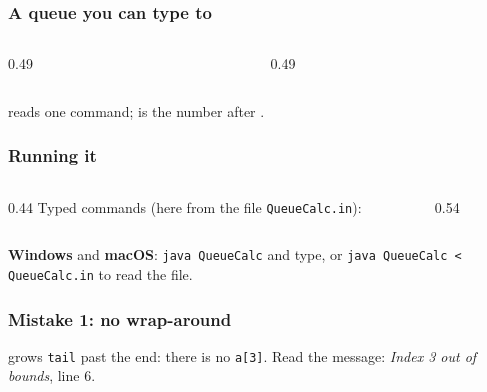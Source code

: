 \documentclass[aspectratio=169,10pt,compress]{beamer}
\newcommand{\win}{\textbf{Windows}}
\newcommand{\mac}{\textbf{macOS}}
\begin{document}




\begin{frame}[t,fragile] \frametitle{A queue you can type to}
  \begin{columns}[T]
    \begin{column}{0.49\textwidth}
    \end{column}
    \begin{column}{0.49\textwidth}
    \end{column}
  \end{columns}
  \small {} reads one command;  is the number after .
\end{frame}




\begin{frame}[t,fragile] \frametitle{Running it}
  \begin{columns}[T]
    \begin{column}{0.44\textwidth}
      \small Typed commands (here from the file \texttt{QueueCalc.in}):
    \end{column}
    \begin{column}{0.54\textwidth}
    \end{column}
  \end{columns}
  \small \win{} and \mac: \texttt{java QueueCalc} and type, or \texttt{java QueueCalc < QueueCalc.in} to read the file.
\end{frame}





\begin{frame}[t,fragile] \frametitle{Mistake 1: no wrap-around}

  \vspace{0.2em}
  \small {} grows \texttt{tail} past the end: there is no \texttt{a[3]}. Read the message: \emph{Index 3 out of bounds}, line 6.
\end{frame}
\end{document}

